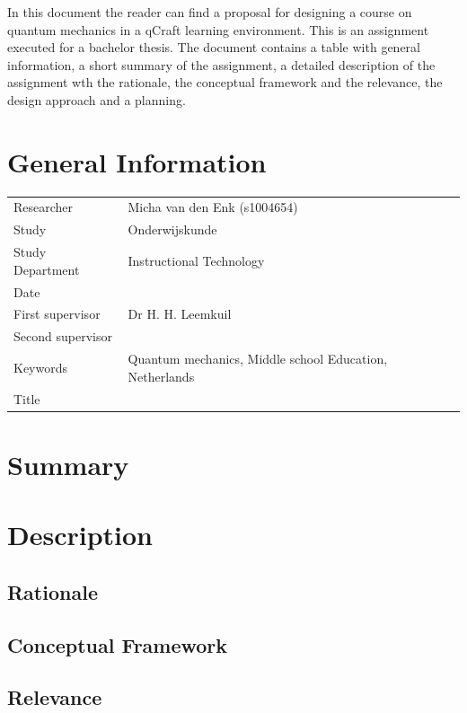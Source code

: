 \documentclass[12pt]{report} %
\begin{document}
In this document the reader can find a proposal for designing a course on quantum mechanics in a qCraft learning environment. This is an assignment executed for a bachelor thesis. The document contains a table with general information, a short summary of the assignment, a detailed description of the assignment wth the rationale, the conceptual framework and the relevance, the design approach and a planning.

\chapter{General Information}

\begin{center}
\begin{tabular}{ l p{8cm} }
Researcher & Micha van den Enk (s1004654) \\
Study & Onderwijskunde \\
Study Department & Instructional Technology \\ 
Date & \\
First supervisor & Dr H. H. Leemkuil \\
Second supervisor & \\
Keywords & Quantum mechanics, Middle school Education, Netherlands \\
Title & \\
\end{tabular}
\end{center}

\chapter{Summary}

\chapter{Description}

\section{Rationale}

\section{Conceptual Framework}

\section{Relevance}
\end{document}
